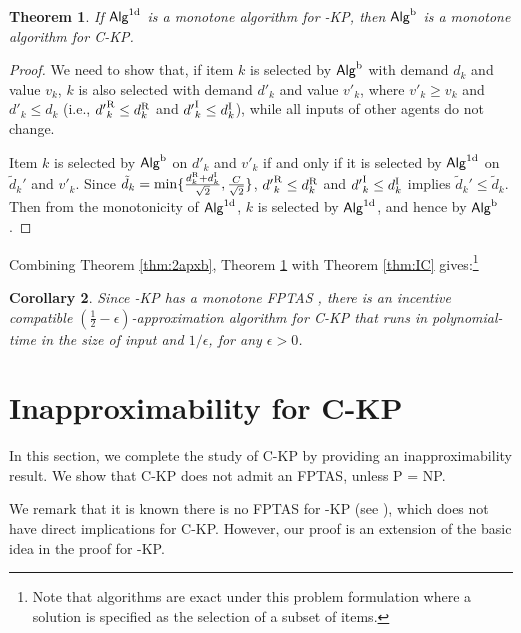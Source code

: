 \documentclass{aamas2013}
\newtheorem{theorem}{Theorem}[section]
\newtheorem{corollary}[theorem]{Corollary}
\begin{document}
\begin{theorem} \label{thm:mon}
If ${\sf Alg}^{\rm 1d}$ is a monotone algorithm for {-KP}, then ${\sf Alg}^{\rm b}$ is a monotone algorithm for {\sc C-KP}.
\end{theorem}

\begin{proof}
We need to show that, if item $k$ is selected by ${\sf Alg}^{\rm b}$ with demand $d_k$ and value $v_k$, $k$ is also selected with demand $d'_k$ and value $v'_k$, where $v'_k \ge v_k$ and ${d'}_k\leq d_k$ (i.e., ${d'}_k^{\rm R} \le d_k^{\rm R}$ and ${d'}_k^{\rm I} \le d_k^{\rm I}$), while all inputs of other agents do not change.  

Item $k$ is selected by ${\sf Alg}^{\rm b}$ on $d'_k$ and $v'_k$ if and only if it is selected by ${\sf Alg}^{\rm 1d}$ on $\tilde{d}_k'$ and $v'_k$. 
Since $\tilde{d}_k =  \min\{ \frac{{d}_k^{\rm R}+{d}_k^{\rm I}}{\sqrt{2}}, \frac{C}{\sqrt{2}} \}$, ${d'}_k^{\rm R} \le d_k^{\rm R}$ and ${d'}_k^{\rm I} \le d_k^{\rm I}$ implies $\tilde{d}_k' \le \tilde{d}_k$. Then from the monotonicity of ${\sf Alg}^{\rm 1d}$, $k$ is selected by ${\sf Alg}^{\rm 1d}$, and hence by ${\sf Alg}^{\rm b}$.
\end{proof}

Combining Theorem \ref{thm:2apxb}, Theorem \ref{thm:mon} with Theorem \ref{thm:IC} gives:\footnote{Note that algorithms are exact under this problem formulation where a solution is specified as the selection of a subset of items.} 
\begin{corollary}
\label{cor:2apxb}
Since {-KP} has a monotone FPTAS \cite{BKV05KS}, there is an incentive compatible $(\frac{1}{2}-\epsilon)$-approximation algorithm for {\sc C-KP} that runs in polynomial-time in the size of input and $1/\epsilon$, for any $\epsilon>0$.
\end{corollary} 


\section{Inapproximability for C-KP}\label{sec:inappr}
\noindent
In this section, we complete the study of {\sc C-KP} by providing an inapproximability result. We show that {\sc C-KP} does not admit an FPTAS, unless P = NP.

We remark that it is known there is no FPTAS for {-KP} (see \cite{KPP10book}), which does not have direct implications for {\sc C-KP}.  However, our proof is an extension of the basic idea in the proof for {-KP}. 
\end{document}
